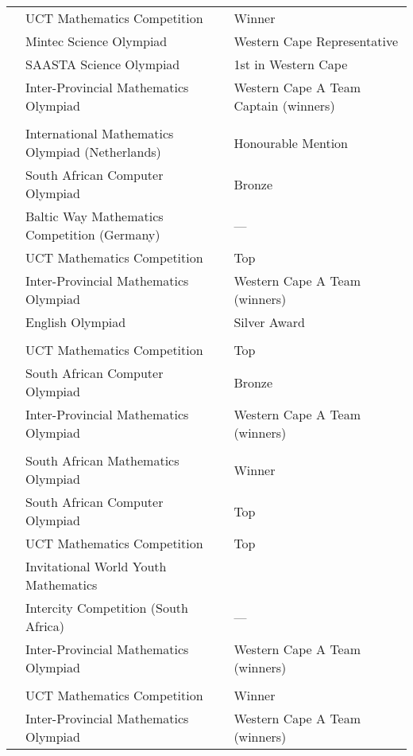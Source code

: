 \begin{tabular}{R{1cm}|ll}
         & UCT Mathematics Competition                                 & Winner\\
         & Mintec Science Olympiad                                     & Western Cape Representative\\
         & SAASTA Science Olympiad                                     & 1st in Western Cape\\
         & Inter-Provincial Mathematics Olympiad                       & Western Cape A Team Captain (winners)\\
         &                                                             & \\
 & International Mathematics Olympiad (Netherlands)            & Honourable Mention\\
         & South African Computer Olympiad                             & Bronze\\
         & Baltic Way Mathematics Competition (Germany)                & ---\\
         & UCT Mathematics Competition                                 & Top \\
         & Inter-Provincial Mathematics Olympiad                       & Western Cape A Team (winners)\\
         & English Olympiad                                            & Silver Award\\
         &                                                             & \\
 & UCT Mathematics Competition                                 & Top \\
         & South African Computer Olympiad                             & Bronze\\
         & Inter-Provincial Mathematics Olympiad                       & Western Cape A Team (winners)\\
         &                                                             & \\
 & South African Mathematics Olympiad                          & Winner\\
         & South African Computer Olympiad                             & Top \\
         & UCT Mathematics Competition                                 & Top \\
         & Invitational World Youth Mathematics                        & \\
         & \hspace{1cm} Intercity Competition (South Africa)           & ---\\
         & Inter-Provincial Mathematics Olympiad                       & Western Cape A Team (winners)\\
         &                                                             & \\
 & UCT Mathematics Competition                                 & Winner\\
         & Inter-Provincial Mathematics Olympiad                       & Western Cape A Team (winners)\\
\end{tabular}

